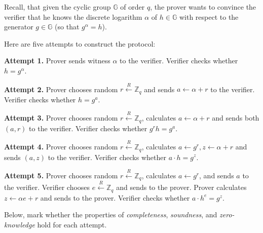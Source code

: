 \documentclass[../lecture-notes.tex]{subfiles}
\begin{document}
    Recall, that given the cyclic group $\mathbb{G}$ of order $q$, the prover wants to convince the verifier that he knows the discrete logarithm $\alpha$ of $h \in \mathbb{G}$ with respect to the generator $g \in \mathbb{G}$ (so that $g^{\alpha}=h$).

    Here are five attempts to construct the protocol:

    \textcolor{purple!80!black}{\textbf{Attempt 1.}} Prover sends witness $\alpha$ to the verifier. Verifier checks whether $h = g^{\alpha}$.

    \textcolor{purple!80!black}{\textbf{Attempt 2.}} Prover chooses random $r \xleftarrow{R} \mathbb{Z}_q$ and sends $a \gets \alpha + r$ to the verifier. Verifier checks whether $h = g^a$.

    \textcolor{purple!80!black}{\textbf{Attempt 3.}} Prover chooses random $r \xleftarrow{R} \mathbb{Z}_q$, calculates $a \gets \alpha + r$ and sends both $(a,r)$ to the verifier. Verifier checks whether $g^r h = g^a$.

    \textcolor{purple!80!black}{\textbf{Attempt 4.}} Prover chooses random $r \xleftarrow{R} \mathbb{Z}_q$, calculates $a \gets g^r, z \gets \alpha+r$ and sends $(a,z)$ to the verifier. Verifier checks whether $a \cdot h = g^z$.

    \textcolor{purple!80!black}{\textbf{Attempt 5.}} Prover chooses random $r \xleftarrow{R} \mathbb{Z}_q$, calculates $a \gets g^r$, and sends $a$ to the verifier. Verifier chooses $e \xleftarrow{R} \mathbb{Z}_q$ and sends to the prover. Prover calculates $z \gets \alpha e + r$ and sends to the prover. Verifier checks whether $a \cdot h^e = g^z$.

    Below, mark whether the properties of \textit{completeness}, \textit{soundness}, and \textit{zero-knowledge} hold for each attempt.

    \begin{center}
    \end{center}
\end{document}
